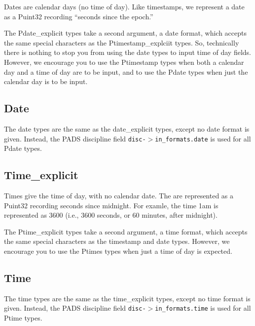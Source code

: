 Dates are calendar days (no time of day).  Like timestamps, we
represent a date as a Puint32 recording ``seconds since the epoch.''

The Pdate\_explicit types take a second argument, a date format,
which accepts the same special characters as the Ptimestamp\_explciit types.
So, technically there is nothing to stop you from using the date types
to input time of day fields.  However, we encourage you to use the
Ptimestamp types when both a calendar day and a time of day are to be
input, and to use the Pdate types when just the calendar day is to be
input.

\subsection{Date}

\aedBegin{}
\aedEnd{}

The date types are the same as the date\_explicit types,
except no date format is given.  Instead, the PADS
discipline field {\tt disc-$>$in\_formats.date} is used
for all Pdate types.

\subsection{Time\_explicit}

\aedBegin{}
\aedEnd{}

Times give the time of day, with no calendar date.  The are
represented as a Puint32 recording seconds since midnight.  For
examle, the time 1am is represented as 3600 (i.e., 3600 seconds, or 60
minutes, after midnight).

The Ptime\_explicit types take a second argument, a time format, which
accepts the same special characters as the timestamp and date types.
However, we encourage you to use the Ptimes types when just a time of
day is expected.

\subsection{Time}

\aedBegin{}
\aedEnd{}

The time types are the same as the time\_explicit types,
except no time format is given.  Instead, the PADS
discipline field {\tt disc-$>$in\_formats.time} is used
for all Ptime types.

